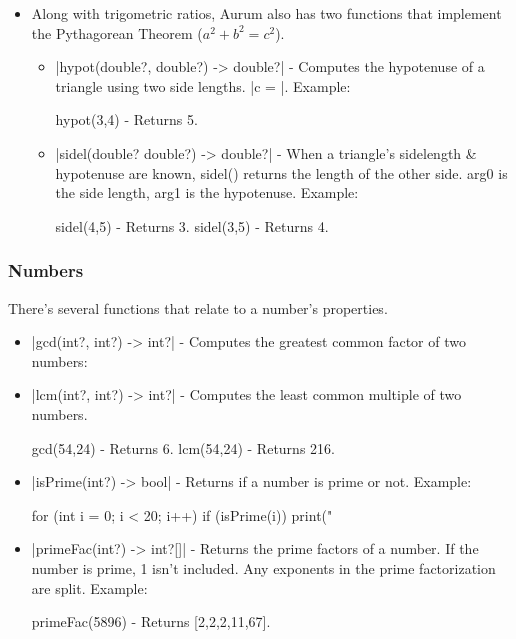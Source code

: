\documentclass[12pt, letterpaper, oneside]{article}
\begin{document}
\begin{itemize}
\begin{itemize}
				\item[--] \spverb|acsch(double?), acschd(double?) -> double?| - Computes $csch^{-1}\theta$. Throws an error for zero.
			\end{itemize}
			\newpage
			\item[--] Along with trigometric ratios, Aurum also has two functions that implement the Pythagorean Theorem ($a^2 + b^2 = c^2$).
			\begin{itemize}
				\item[--] \spverb|hypot(double?, double?) -> double?| - Computes the hypotenuse of a triangle using two side lengths. \spverb|c = |. Example:

				
				\begin{spverbatim}
					hypot(3,4) - Returns 5.
				\end{spverbatim}
				\newline
				\item[--] \spverb|sidel(double? double?) -> double?| - When a triangle's sidelength \& hypotenuse are known, sidel() returns the length of the other side. arg0 is the side length, arg1 is the hypotenuse. Example:
				\begin{spverbatim}
					sidel(4,5) - Returns 3.
					sidel(3,5) - Returns 4.
				\end{spverbatim}
			\end{itemize}
		\end{itemize}  
	\subsubsection{Numbers}
	There's several functions that relate to a number's properties.
	\begin{itemize}
		\item[--] \spverb|gcd(int?, int?) -> int?| - Computes the greatest common factor of two numbers:
		\item[--] \spverb|lcm(int?, int?) -> int?| - Computes the least common multiple of two numbers.
		\begin{spverbatim}
			gcd(54,24) - Returns 6.
			lcm(54,24) - Returns 216.
		\end{spverbatim}
		\newpage
		\item[--] \spverb|isPrime(int?) -> bool| - Returns if a number is prime or not. Example:
		
		
		\begin{spverbatim}
			for (int i = 0; i < 20; i++) {
				if (isPrime(i)) {
					print("%
				}
			}
		\end{spverbatim}
		\newline
		\item[--] \spverb|primeFac(int?) -> int?[]| - Returns the prime factors of a number. If the number is prime, 1 isn't included. Any exponents in the prime factorization are split. Example:
		
		
		\begin{spverbatim}
			primeFac(5896) - Returns [2,2,2,11,67].
		\end{spverbatim}
		\newline
	\end{itemize}
	
\end{document}
